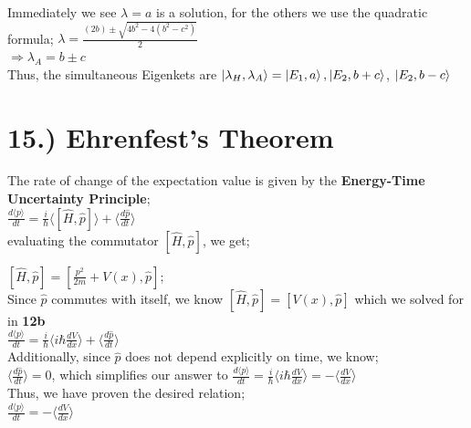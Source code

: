 \documentclass[10pt]{article}
\begin{document}
Immediately we see $\lambda=a$ is a solution, for the others we use the quadratic formula;  $\lambda=\frac{(2b)\pm\sqrt{4b^2-4(b^2-c^2)}}{2}$\\

$\Rightarrow \lambda_A=b\pm c$\\

Thus, the simultaneous Eigenkets are $\ket{\lambda_H,\lambda_A}=\ket{E_1,a},\ket{E_2,b+c}$, $\ket{E_2,b-c}$\\
\pagebreak
\section*{15.) Ehrenfest's Theorem}

The rate of change of the expectation value is given by the \textbf{Energy-Time Uncertainty Principle};\\

$\frac{d\langle p\rangle}{dt}=\frac{i}{\hbar}\langle[\hat{H},\hat{p}]\rangle+\langle\frac{d\hat{p}}{dt}\rangle$\\

evaluating the commutator $[\hat{H},\hat{p}]$, we get;

$[\hat{H},\hat{p}]=[\frac{p^2}{2m}+V(x),\hat{p}]$;\\

Since $\hat{p}$ commutes with itself, we know $[\hat{H},\hat{p}]=[V(x),\hat{p}]$ which we solved for in \textbf{12b}\\

$\frac{d\langle p\rangle}{dt}=\frac{i}{\hbar}\langle i\hbar\frac{dV}{dx}\rangle+\langle\frac{d\hat{p}}{dt}\rangle$\\

Additionally, since $\hat{p}$ does not depend explicitly on time, we know;\\

$\langle\frac{d\hat{p}}{dt}\rangle=0$, which simplifies our answer to $\frac{d\langle p\rangle}{dt}=\frac{i}{\hbar}\langle i\hbar\frac{dV}{dx}\rangle=-\langle\frac{dV}{dx}\rangle$\\

Thus, we have proven the desired relation;\\

\huge{$\frac{d\langle p\rangle}{dt}=-\langle\frac{dV}{dx}\rangle$}\\
\end{document}
